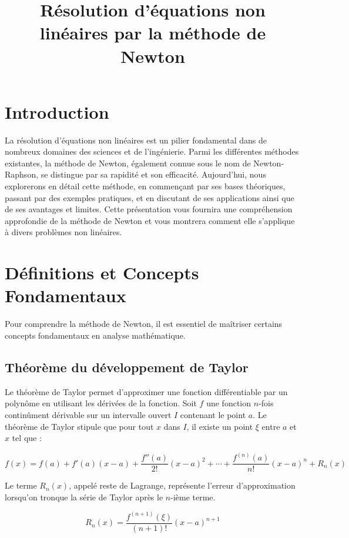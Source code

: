 \documentclass{article}
\begin{document}
\title{Résolution d'équations non linéaires par la méthode de Newton}


\maketitle
\newpage
\tableofcontents
\newpage

\section*{Introduction}
La résolution d'équations non linéaires est un pilier fondamental dans de nombreux domaines des sciences et de l'ingénierie. Parmi les différentes méthodes existantes, la méthode de Newton, également connue sous le nom de Newton-Raphson, se distingue par sa rapidité et son efficacité. Aujourd'hui, nous explorerons en détail cette méthode, en commençant par ses bases théoriques, passant par des exemples pratiques, et en discutant de ses applications ainsi que de ses avantages et limites. Cette présentation vous fournira une compréhension approfondie de la méthode de Newton et vous montrera comment elle s'applique à divers problèmes non linéaires.

\section{Définitions et Concepts Fondamentaux}
Pour comprendre la méthode de Newton, il est essentiel de maîtriser certains concepts fondamentaux en analyse mathématique.

\subsection{Théorème du développement de Taylor}
Le théorème de Taylor permet d'approximer une fonction différentiable par un polynôme en utilisant les dérivées de la fonction. Soit $f$ une fonction $n$-fois continûment dérivable sur un intervalle ouvert $I$ contenant le point $a$. Le théorème de Taylor stipule que pour tout $x$ dans $I$, il existe un point $\xi$ entre $a$ et $x$ tel que :

\[
f(x) = f(a) + f'(a)(x - a) + \frac{f''(a)}{2!}(x - a)^2 + \cdots + \frac{f^{(n)}(a)}{n!}(x - a)^n + R_n(x)
\]

Le terme $R_n(x)$, appelé reste de Lagrange, représente l'erreur d'approximation lorsqu'on tronque la série de Taylor après le $n$-ième terme.

\[
R_n(x) = \frac{f^{(n+1)}(\xi)}{(n+1)!}(x - a)^{n+1}
\]
\end{document}
